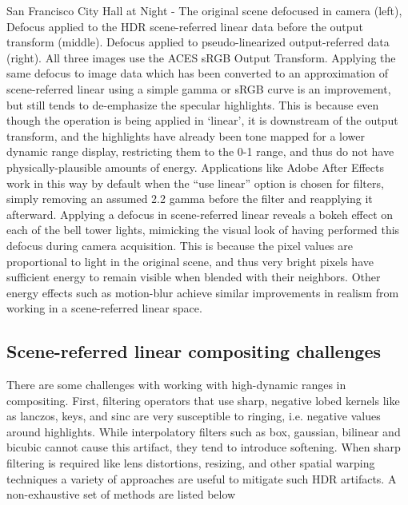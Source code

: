 San Francisco City Hall at Night - The original scene defocused in camera (left), Defocus applied to the HDR scene-referred linear data before the output transform (middle). Defocus applied to pseudo-linearized output-referred data (right). All three images use the ACES sRGB Output Transform.
Applying the same defocus to image data which has been converted to an approximation of scene-referred linear using a simple gamma or sRGB curve is an improvement, but still tends to de-emphasize the specular highlights. This is because even though the operation is being applied in ‘linear’, it is downstream of the output transform, and the highlights have already been tone mapped for a lower dynamic range display, restricting them to the 0-1 range, and thus do not have physically-plausible amounts of energy. Applications like Adobe After Effects work in this way by default when the “use linear” option is chosen for filters, simply removing an assumed 2.2 gamma before the filter and reapplying it afterward. Applying a defocus in scene-referred linear reveals a bokeh effect on each of the bell tower lights, mimicking the visual look of having performed this defocus during camera acquisition. This is because the pixel values are proportional to light in the original scene, and thus very bright pixels have sufficient energy to remain visible when blended with their neighbors. Other energy effects such as motion-blur achieve similar improvements in realism from working in a scene-referred linear space.

\subsection{Scene-referred linear compositing challenges}

There are some challenges with working with high-dynamic ranges in compositing. First, filtering operators that use sharp, negative lobed kernels like as lanczos, keys, and sinc are very susceptible to ringing, i.e. negative values around highlights. While interpolatory filters such as box, gaussian, bilinear and bicubic cannot cause this artifact, they tend to introduce softening. When sharp filtering is required like lens distortions, resizing, and other spatial warping techniques a variety of approaches are useful to mitigate such HDR artifacts. A non-exhaustive set of methods are listed below

